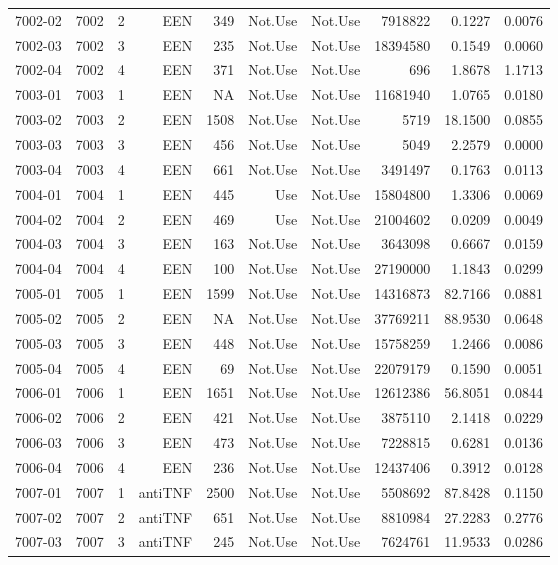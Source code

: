 {\begin{longtable}{ | r | r | r | r | r | r | r | r | r | r | }
7002-02 & 7002 & 2 & EEN & 349 & Not.Use & Not.Use & 7918822 & 0.1227 & 0.0076\\ 
7002-03 & 7002 & 3 & EEN & 235 & Not.Use & Not.Use & 18394580 & 0.1549 & 0.0060\\ 
7002-04 & 7002 & 4 & EEN & 371 & Not.Use & Not.Use & 696 & 1.8678 & 1.1713\\ 
7003-01 & 7003 & 1 & EEN & NA & Not.Use & Not.Use & 11681940 & 1.0765 & 0.0180\\ 
7003-02 & 7003 & 2 & EEN & 1508 & Not.Use & Not.Use & 5719 & 18.1500 & 0.0855\\ 
7003-03 & 7003 & 3 & EEN & 456 & Not.Use & Not.Use & 5049 & 2.2579 & 0.0000\\ 
7003-04 & 7003 & 4 & EEN & 661 & Not.Use & Not.Use & 3491497 & 0.1763 & 0.0113\\ 
7004-01 & 7004 & 1 & EEN & 445 & Use & Not.Use & 15804800 & 1.3306 & 0.0069\\ 
7004-02 & 7004 & 2 & EEN & 469 & Use & Not.Use & 21004602 & 0.0209 & 0.0049\\ 
7004-03 & 7004 & 3 & EEN & 163 & Not.Use & Not.Use & 3643098 & 0.6667 & 0.0159\\ 
7004-04 & 7004 & 4 & EEN & 100 & Not.Use & Not.Use & 27190000 & 1.1843 & 0.0299\\ 
7005-01 & 7005 & 1 & EEN & 1599 & Not.Use & Not.Use & 14316873 & 82.7166 & 0.0881\\ 
7005-02 & 7005 & 2 & EEN & NA & Not.Use & Not.Use & 37769211 & 88.9530 & 0.0648\\ 
7005-03 & 7005 & 3 & EEN & 448 & Not.Use & Not.Use & 15758259 & 1.2466 & 0.0086\\ 
7005-04 & 7005 & 4 & EEN & 69 & Not.Use & Not.Use & 22079179 & 0.1590 & 0.0051\\ 
7006-01 & 7006 & 1 & EEN & 1651 & Not.Use & Not.Use & 12612386 & 56.8051 & 0.0844\\ 
7006-02 & 7006 & 2 & EEN & 421 & Not.Use & Not.Use & 3875110 & 2.1418 & 0.0229\\ 
7006-03 & 7006 & 3 & EEN & 473 & Not.Use & Not.Use & 7228815 & 0.6281 & 0.0136\\ 
7006-04 & 7006 & 4 & EEN & 236 & Not.Use & Not.Use & 12437406 & 0.3912 & 0.0128\\ 
7007-01 & 7007 & 1 & antiTNF & 2500 & Not.Use & Not.Use & 5508692 & 87.8428 & 0.1150\\ 
7007-02 & 7007 & 2 & antiTNF & 651 & Not.Use & Not.Use & 8810984 & 27.2283 & 0.2776\\ 
7007-03 & 7007 & 3 & antiTNF & 245 & Not.Use & Not.Use & 7624761 & 11.9533 & 0.0286\\ 

\end{longtable}}
